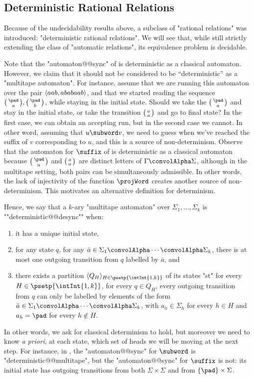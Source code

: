 \subsection{Deterministic Rational Relations}
\label{sec:prelim-automatic-drat}

Because of the undecidability results above, a subclass of "rational relations" was introduced:
"deterministic rational relations". We will see that, while still strictly extending the class of
"automatic relations", its equivalence problem is decidable.

Note that the "automaton@@sync" of  is deterministic
as a classical automaton. However, we claim that it should not be considered to be ``deterministic''
as a "multitape automaton".
For instance, assume that we are running this automaton over the pair
$\langle aab, ababaab\rangle$, and that we started reading the sequence $\pair{\pad}{a}, \pair{\pad}{b}$,
while staying in the initial state. Should we take the
$\pair{\pad}{a}$ and stay in the initial state, or take the transition $\pair{a}{a}$ and go to 
final state? In the first case, we can obtain an accepting run, but in the second case we cannot.
In other word, assuming that $u \subword v$, we need to guess when we've reached the suffix of
$v$ corresponding to $u$, and this is a source of non-determinism. Observe that
the automaton for $\suffix$ of  is deterministic as a classical automaton
because $\pair{\pad}{a}$ and $\pair{a}{a}$ are distinct letters of $\Gamma\convolAlpha\Sigma$, 
although in the multitape setting, both pairs can be simultaneously admissible.
In other words, the lack of injectivity of the function $\projWord$ creates another
source of non-determinism. This motivates an alternative definition for determinism.

Hence, we say that a $k$-ary "multitape automaton" over $\Sigma_1,\dotsc,\Sigma_k$
is ""deterministic@@desync"" when:
\begin{enumerate}
	\item it has a unique initial state,
	\item for any state $q$, for any $\bar a \in \Sigma_1\convolAlpha\cdots\convolAlpha\Sigma_k$,
		there is at most one outgoing transition from $q$ labelled by $\bar a$, and
	\item there exists a partition $\tup{Q_H}_{H \in \psetp{\intInt{1,k}}}$ of its states 	
		"st" for every $H\in\psetp{\intInt{1,k}}$, for every $q \in Q_H$,
		every outgoing transition from $q$ can only be labelled by elements of
		the form $\bar a \in \Sigma_1\convolAlpha\cdots\convolAlpha\Sigma_k$, with
		$a_h \in \Sigma_h$ for every $h\in H$ and $a_h = \pad$ for every $h\not\in H$.
\end{enumerate}
In other words, we ask for classical determinism to hold, but moreover we need to know \emph{a priori}, at each state, which set of heads we will be moving at the next step.
For instance, in ,
the "automaton@@sync" for $\subword$ is "deterministic@@multitape",
but the "automaton@@sync" for $\suffix$ is not: its
initial state has outgoing transitions from both $\Sigma \times \Sigma$ and
from $\{\pad\}\times\Sigma$.

